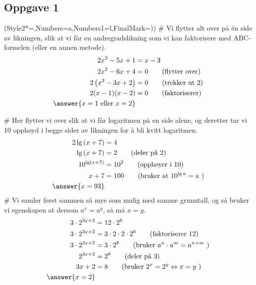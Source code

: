 \subsection*{Oppgave 1}
\begin{easylist}[enumerate]
\ListProperties(Style2*=,Numbers=a,Numbers1=l,FinalMark={)})
# Vi flytter alt over på én side av likningen, slik at vi får en andregradslikning som vi kan faktorisere med ABC-formelen (eller en annen metode).
\begin{align*}
	2x^2 - 5x + 1 &= x - 3 \\
	2x^2 - 6x + 4 &= 0 \qquad \text{(flytter over)}\\
	2 \left( x^2 - 3x + 2 \right) &= 0 \qquad \text{(trekker ut 2)} \\
	2 (x-1)(x-2) &= 0 \qquad \text{(faktoriserer)}\\
	\answer{x = 1 \text{ eller } x = 2} &	
\end{align*}

# Her flytter vi over slik at vi får logaritmen på en side alene, og deretter tar vi 10 opphøyd i begge sider av likningen for å bli kvitt logaritmen.
\begin{align*}
	2 \lg \left(x + 7\right) &= 4 \\
	\lg \left(x + 7\right) &= 2  \qquad \text{(deler på 2)}\\
	10^{\lg \left(x + 7\right)} &= 10^2  \qquad \text{(opphøyer i 10)}\\
	x + 7 &= 100 \qquad \text{(bruker at } 10^{\lg a} = a \text{ )} \\
	\answer{x = 93}
\end{align*}
# Vi samler først sammen så mye som mulig med samme grunntall, og så bruker vi egenskapen at dersom $a^x = a^y$, så må $x=y$.
\begin{align*}
	3 \cdot 2^{3x+ 2} &= 12 \cdot 2^6 \\
	3 \cdot 2^{3x+ 2} &= 3 \cdot 2 \cdot 2 \cdot 2^6 \qquad \text{(faktoriserer 12)} \\
	3 \cdot 2^{3x+ 2} &= 3 \cdot 2^8 \qquad \text{(bruker } a^n \cdot a^m = a^{n+m} \text{ )} \\
	 2^{3x+ 2} &= 2^8 \qquad \text{(deler på 3)} \\
	  {3x+ 2} &= 8 \qquad \text{(bruker } 2^x = 2^y \Leftrightarrow x = y \text{ )} \\
	  \answer{x = 2}
\end{align*}
\end{easylist}

